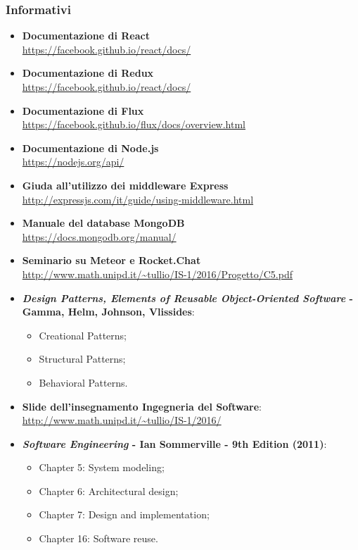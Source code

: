 \subsubsection{Informativi}
\begin{itemize}
	\item \textbf{Documentazione di React}
	\\ \url{https://facebook.github.io/react/docs/}
	\item \textbf{Documentazione di Redux}
	\\ \url{https://facebook.github.io/react/docs/}
	\item \textbf{Documentazione di Flux}
	\\ \url{https://facebook.github.io/flux/docs/overview.html}
	\item \textbf{Documentazione di Node.js}
	\\ \url{https://nodejs.org/api/}
	\item \textbf{Giuda all’utilizzo dei middleware Express}
	\\ \url{http://expressjs.com/it/guide/using-middleware.html}
	\item \textbf{Manuale del database MongoDB}
	\\ \url{https://docs.mongodb.org/manual/}
	\item \textbf{Seminario su Meteor e Rocket.Chat}\\ \url{http://www.math.unipd.it/~tullio/IS-1/2016/Progetto/C5.pdf}
	\item \textbf{\textit{Design Patterns, Elements of Reusable Object-Oriented Software} - Gamma, Helm, Johnson, Vlissides}:
	\begin{itemize}
		\item Creational Patterns;
		\item Structural Patterns;
		\item Behavioral Patterns.
	\end{itemize}
	\item \textbf{Slide dell'insegnamento Ingegneria del Software}:\\
	\url{http://www.math.unipd.it/~tullio/IS-1/2016/}
	\item \textbf{\textit{Software Engineering} - Ian Sommerville - 9th Edition (2011)}:
	\begin{itemize}
		\item Chapter 5: System modeling;
		\item Chapter 6: Architectural design;
		\item Chapter 7: Design and implementation;
		\item Chapter 16: Software reuse.
	\end{itemize}
\end{itemize}
